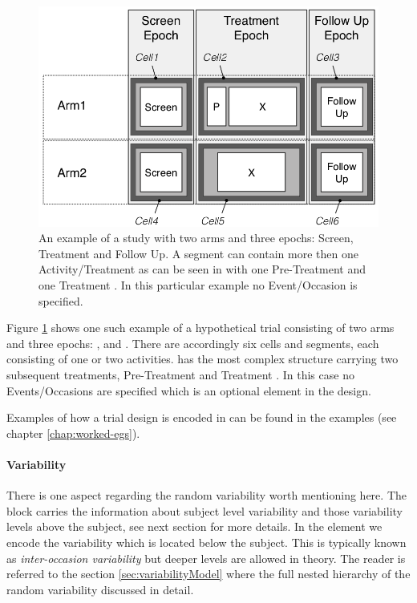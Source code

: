 \begin{figure}[htb]
\centering
\includegraphics[height=0.35\textheight]{pics/templateTrialDesign}%
\caption{An example of a study with two arms and three epochs: Screen,
Treatment and Follow Up. A segment can contain more then one Activity/Treatment
as can be seen in  with one Pre-Treatment  and one Treatment .
In this particular example no Event/Occasion is specified.}
\label{fig:templateTrialDesign}
\end{figure}
Figure \ref{fig:templateTrialDesign} shows one such example of a hypothetical trial
consisting of two arms and three epochs: ,  and
. There are accordingly six cells and segments, each consisting of one
or two activities.  has the most complex structure carrying two
subsequent treatments, Pre-Treatment  and Treatment . In this case
no Events/Occasions are specified which is an optional element in the design.

Examples of how a trial design is encoded in \pharmml can be found in
the examples (see chapter \ref{chap:worked-egs}).

\paragraph{Variability}
There is one aspect regarding the random variability worth mentioning
here. The  block carries the information about subject 
level variability and those variability levels above the subject, see next section for more details.  
In the  element we encode the variability which is located below the
subject. This is typically known as \textit{inter-occasion variability} but deeper levels
are allowed in theory. The reader is referred to the section \ref{sec:variabilityModel} where the 
full nested hierarchy of the random variability discussed in detail.


